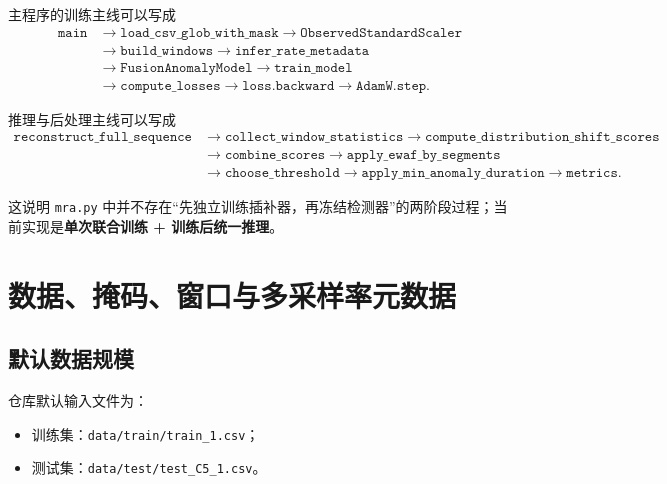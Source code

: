\documentclass[UTF8]{ctexart}
\newcommand{\code}[1]{\texttt{#1}}
\begin{document}
主程序的训练主线可以写成
\begin{equation}
    \begin{aligned}
        \texttt{main}
        &\rightarrow \texttt{load\_csv\_glob\_with\_mask}
        \rightarrow \texttt{ObservedStandardScaler} \\
        &\rightarrow \texttt{build\_windows}
        \rightarrow \texttt{infer\_rate\_metadata} \\
        &\rightarrow \texttt{FusionAnomalyModel}
        \rightarrow \texttt{train\_model} \\
        &\rightarrow \texttt{compute\_losses}
        \rightarrow \texttt{loss.backward}
        \rightarrow \texttt{AdamW.step}.
    \end{aligned}
\end{equation}

推理与后处理主线可以写成
\begin{equation}
    \begin{aligned}
        \texttt{reconstruct\_full\_sequence}
        &\rightarrow \texttt{collect\_window\_statistics}
        \rightarrow \texttt{compute\_distribution\_shift\_scores} \\
        &\rightarrow \texttt{combine\_scores}
        \rightarrow \texttt{apply\_ewaf\_by\_segments} \\
        &\rightarrow \texttt{choose\_threshold}
        \rightarrow \texttt{apply\_min\_anomaly\_duration}
        \rightarrow \texttt{metrics}.
    \end{aligned}
\end{equation}

这说明 \code{mra.py} 中并不存在“先独立训练插补器，再冻结检测器”的两阶段过程；当前实现是\textbf{单次联合训练 + 训练后统一推理}。

\section{数据、掩码、窗口与多采样率元数据}

\subsection{默认数据规模}

仓库默认输入文件为：
\begin{itemize}
    \item 训练集：\code{data/train/train\_1.csv}；
    \item 测试集：\code{data/test/test\_C5\_1.csv}。
\end{itemize}
\end{document}
